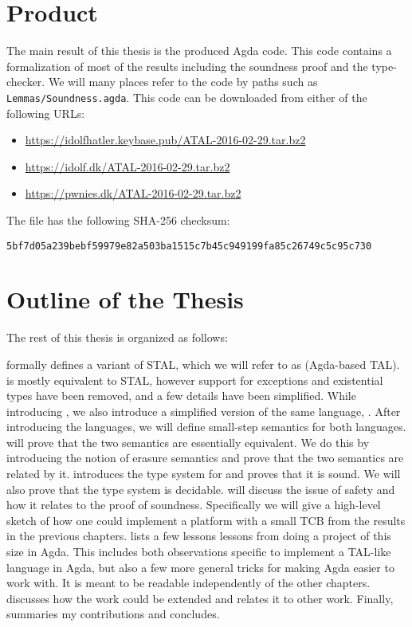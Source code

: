 \section{Product}
The main result of this thesis is the produced Agda code. This code contains a
formalization of most of the results including the soundness proof and the
type-checker. We will many places refer to the code by paths such as
\texttt{Lemmas/Soundness.agda}. This code can be downloaded from either of the
following URLs:

\begin{itemize}
\item \url{https://idolfhatler.keybase.pub/ATAL-2016-02-29.tar.bz2}
\item \url{https://idolf.dk/ATAL-2016-02-29.tar.bz2}
\item \url{https://pwnies.dk/ATAL-2016-02-29.tar.bz2}
\end{itemize}

The file has the following SHA-256 checksum:

\begin{verbatim}
5bf7d05a239bebf59979e82a503ba1515c7b45c949199fa85c26749c5c95c730
\end{verbatim}


\section{Outline of the Thesis}

The rest of this thesis is organized as follows:

\textbf{} formally defines a variant of STAL, which we will
refer to as \ATAL (Agda-based TAL). \ATAL is mostly equivalent to STAL, however
support for exceptions and existential types have been removed, and a few
details have been simplified. While introducing \ATAL, we also introduce a
simplified version of the same language, \ATALe. After introducing the
languages, we will define small-step semantics for both
languages. \textbf{} will prove that the two semantics are
essentially equivalent. We do this by introducing the notion of erasure
semantics and prove that the two semantics are related by
it. \textbf{} introduces the type system for \ATAL and proves
that it is sound. We will also prove that the type system is
decidable. \textbf{} will discuss the issue of safety and
how it relates to the proof of soundness. Specifically we will give a high-level
sketch of how one could implement a platform with a small TCB from the results
in the previous chapters. \textbf{} lists a few lessons
lessons from doing a project of this size in Agda. This includes both
observations specific to implement a TAL-like language in Agda, but also a few
more general tricks for making Agda easier to work with. It is meant to be
readable independently of the other chapters. \textbf{}
discusses how the work could be extended and relates it to other work. Finally,
\textbf{} summaries my contributions and concludes.
